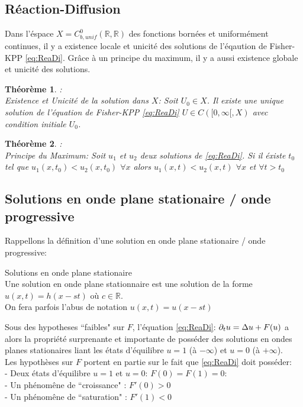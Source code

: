 \subsection{Réaction-Diffusion}
Dans l'éspace $X=C^0_{b,unif}(\mathbb{R},\mathbb{R})$ des fonctions bornées et uniformément continues, il y a existence locale et unicité des solutions de l'éqaution de Fisher-KPP \eqref{eq:ReaDi}. Grâce à un principe du maximum, il y a aussi existence globale et unicité des solutions.
\newtheorem{theorem}{Théorème}
\begin{theorem}:\\ Existence et Unicité de la solution dans $X$: Soit $U_0 \in X$. Il existe une unique solution de l'équation de Fisher-KPP \eqref{eq:ReaDi}  $U \in C([0,\infty[,X)$ avec condition initiale $U_0$. \end{theorem}
\begin{theorem}:\\ Principe du Maximum: Soit $u_1$ et $u_2$ deux solutions de \eqref{eq:ReaDi}. Si il éxiste $t_0$ tel que $u_1(x,t_0)<u_2(x,t_0) $ $\forall x$ alors $u_1(x,t)<u_2(x,t)$  $ \forall x$ et $\forall t>t_0$ \end{theorem}

\subsection{Solutions en onde plane stationaire / onde progressive}
Rappellons la définition d'une solution en onde plane stationaire / onde progressive:
\begin{definition}{Solutions en onde plane stationaire}\\Une solution en onde plane stationnaire est une solution de la forme $u(x,t)=h(x-st)$ où $c \in \mathbb{R} $.\\ On fera parfois l'abus de notation $u(x,t)=u(x-st)$
\end{definition}
Sous des hypotheses ``faibles" sur $F$, l'équation \eqref{eq:ReaDi}: $\partial_t u = \Delta u + F(u)$ a alors la propriété surprenante et importante de posséder des solutions en ondes planes stationaires liant les états d'équilibre $u=1$ (à $-\infty$) et $u=0$ (à $+\infty$).\\
Les hypothèses sur $F$ portent en partie sur le fait que \eqref{eq:ReaDi} doit posséder:\\
- Deux états d'équilibre $u=1$ et $u=0$: $F(0)=F(1)=0$:\\
- Un phénomêne de ``croissance" : $F'(0)>0$\\
- Un phénomêne de ``saturation" : $F'(1)<0$ \\
